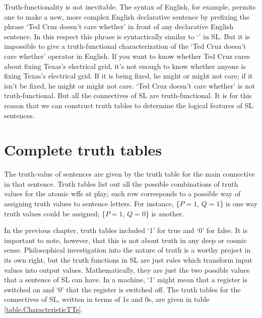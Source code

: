 Truth-functionality is not inevitable.
The syntax of English, for example, permits one to make a new, more complex English declarative sentence by prefixing the phrase `Ted Cruz doesn't care whether' in front of any declarative English sentence.
In this respect this phrase is syntactically similar to `\enot' in SL.
But it is impossible to give a truth-functional characterization of the `Ted Cruz doesn't care whether' operator in English.
If you want to know whether Ted Cruz cares about fixing Texas's electrical grid, it's not enough to know whether anyone is fixing Texas's electrical grid.
If it is being fixed, he might or might not care; if it isn't be fixed, he might or might not care. 
`Ted Cruz doesn't care whether' is not truth-functional. But all the connectives of SL are truth-functional.
It is for this reason that we can construct truth tables to determine the logical features of SL sentences.



\section{Complete truth tables}

The truth-value of sentences are given by the truth table for the main connective in that sentence.
Truth tables list out all the possible combinations of truth values for the atomic wffs at play; each row corresponds to a possible way of assigning truth values to sentence letters.
For instance, \{$P=1$, $Q=1$\} is one way truth values could be assigned; \{$P=1$, $Q=0$\} is another.

In the previous chapter, truth tables included `1' for true and `0' for false.
It is important to note, however, that this is not about truth in any deep or cosmic sense.
Philosophical investigation into the nature of truth is a worthy project in its own right, but the truth functions in SL are just rules which transform input values into output values.
Mathematically, they are just the two possible values that a sentence of SL can have.
In a machine, `1' might mean that a register is switched on and `0' that the register is switched off.
The truth tables for the connectives of SL, written in terms of 1s and 0s, are given in table \ref{table.CharacteristicTTs}.

